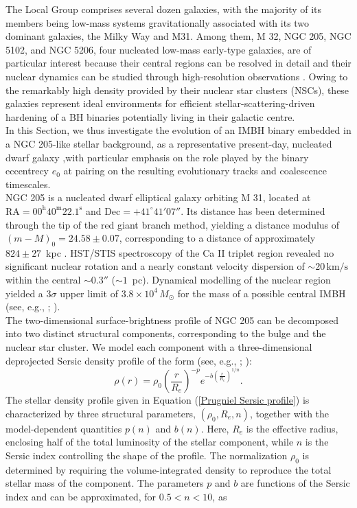 \documentclass[12pt,twoside,openany]{book}
\begin{document}
The Local Group comprises several dozen galaxies, with the majority of its members being low-mass systems gravitationally associated with its two dominant galaxies, the Milky Way and M31. Among them, M 32, NGC 205, NGC 5102, and NGC 5206, four nucleated low-mass early-type galaxies, are of particular interest because their central regions can be resolved in detail and their nuclear dynamics can be studied through high-resolution observations \parencite{Nguyen_2018}. Owing to the remarkably high density provided by their nuclear star clusters (NSCs), these galaxies represent ideal environments for efficient stellar-scattering-driven hardening of a BH binaries potentially living in their galactic centre.\\In this Section, we thus investigate the evolution of an IMBH binary embedded in a NGC 205-like stellar background, as a representative present-day, nucleated dwarf galaxy ,with particular emphasis on the role played by the binary eccentrecy $e_0$ at pairing on the resulting evolutionary tracks and coalescence timescales.\\NGC 205 is a nucleated dwarf elliptical galaxy orbiting M 31, located at $\mathrm{RA}=00^{\mathrm h}40^{\mathrm m}22.1^{\mathrm s}$ and $\mathrm{Dec}=+41^\circ41'07''$. Its distance has been determined through the tip of the red giant branch method, yielding a distance modulus of $(m-M)_0=24.58\pm0.07$, corresponding to a distance of approximately $824\pm27$~kpc \parencite{McConnachie_2005}. HST/STIS spectroscopy of the Ca II triplet region revealed no significant nuclear rotation and a nearly constant velocity dispersion of $\sim20\,\mathrm{km/s}$ within the central $\sim0.3''$ ($\sim1$~pc). Dynamical modelling of the nuclear region yielded a $3\sigma$ upper limit of $3.8\times10^4\,M_\odot$ for the mass of a possible central IMBH (see, e.g., \citealt{Valluri_2005}; \citealt{Geha_2006}).\\The two-dimensional surface-brightness profile of NGC 205 can be decomposed into two distinct structural components, corresponding to the bulge and the nuclear star cluster. We model each component with a three-dimensional deprojected Sersic density profile \parencite{Sersic_1968} of the form (see, e.g., \citealt{Prugniel_1997}; \citealt{Terzic_2005}):
\begin{equation}\label{Prugniel Sersic profile}
    \rho(r)=\rho_0\left(\frac{r}{R_e}\right)^{-p}e^{-b\left(\frac{r}{R_e}\right)^{1/n}}.
\end{equation}
The stellar density profile given in Equation (\ref{Prugniel Sersic profile}) is characterized by three structural parameters, $(\rho_0,R_e,n)$, together with the model-dependent quantities $p(n)$ and $b(n)$. Here, $R_e$ is the effective radius, enclosing half of the total luminosity of the stellar component, while $n$ is the Sersic index controlling the shape of the profile. The normalization $\rho_0$ is determined by requiring the volume-integrated density to reproduce the total stellar mass of the component. The parameters $p$ and $b$ are functions of the Sersic index and can be approximated, for $0.5<n<10$, as
\end{document}
